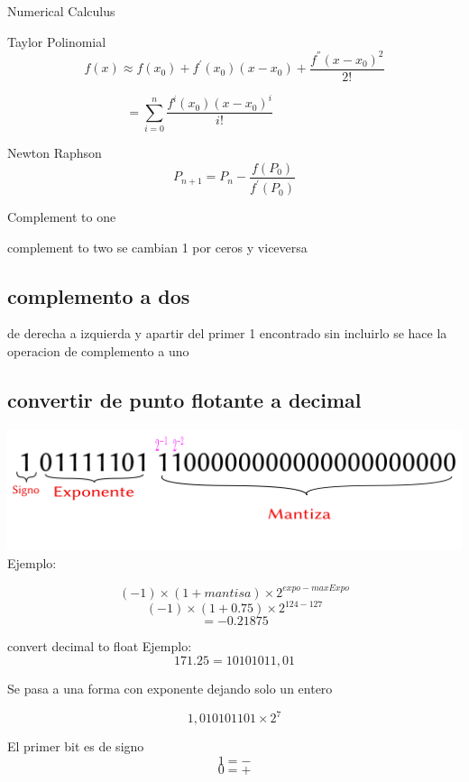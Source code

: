 \newpage
\begin{section}{Numerical Calculus}
\begin{subsection}{Taylor Polinomial}
$$f(x) \approx f(x_0) + f^{'}(x_0)(x-x_0) + \frac{f^{''}(x-x_0)^2}{2!}$$

$$= \sum\limits_{i=0}^{n} \frac{f^{i}(x_0)(x-x_0)^i } {i!} \;\;\;\;\;\;\;\;\;\;\;\;\;\;\;\;\;\;\;\;$$

\end{subsection}
\begin{subsection}{Newton Raphson}
$$ P_{n+1} = P_n - \frac{f(P_0)}{f^{'}(P_0)} $$

\end{subsection}
\begin{subsection}{Complement to one}

\end{subsection}
\begin{subsection}{complement to two }
se cambian 1 por ceros y viceversa
\subsection{complemento a dos}
de derecha a izquierda y apartir del primer 1 encontrado sin incluirlo se 
hace la operacion de complemento a uno
\subsection{convertir de punto flotante a decimal}
\includegraphics[scale = 0.5]{1.png}
Ejemplo:

$$(-1) \times (1+mantisa) \times {2^{expo - maxExpo} } $$
$$(-1) \times (1+0.75) \times 2^{124-127} $$
$$ = -0.21875$$

\end{subsection}
\begin{subsection}{convert decimal to float}
Ejemplo:
$$171.25 = 10101011,01$$

Se pasa a una forma con exponente dejando solo un entero

$$1,010101101 \times 2^7 $$

El primer bit es de signo $$1 = -$$ $$0 = +$$


\end{subsection}
\end{section}
